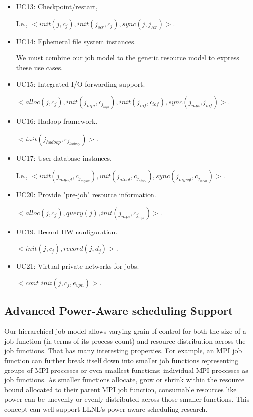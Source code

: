 \documentclass[10pt]{article}
\begin{document}
\begin{itemize}
\item{UC13: Checkpoint/restart, 

I.e., $<init(j, c_j), init(j_{scr}, c_j), sync(j, j_{scr})>$.} 

\item{UC14: Ephemeral file system instances. 

We must combine our job model to the generic resource model to express these use cases.}

\item{UC15: Integrated I/O forwarding support. 

$<alloc(j, c_j), init(j_{mpi}, c_{j_{mpi}}), init(j_{iof}, c_{iof}), sync(j_{mpi}, j_{iof})>$.}

\item{UC16: Hadoop framework. 

$<init(j_{hadoop}, c_{j_{hadoop}})>$.} 

\item{UC17: User database instances. 

I.e., $<init(j_{mysql}, c_{j_{mysql}}), init(j_{atool}, c_{j_{atool}}), sync(j_{mysql}, c_{j_{atool}})>$.}

\item{UC20: Provide "pre-job" resource information. 

$<alloc(j, c_j), query(j), init(j_{mpi}, c_{j_{mpi}})>$.}

\item{UC19: Record HW configuration. 

$<init(j, c_j), record(j, d_j)>$.}

\item{UC21: Virtual private networks for jobs. 

$<cont\_init(j, c_j, e_{vpn})>$.}

\end{itemize}


\subsection{Advanced Power-Aware scheduling Support}
Our hierarchical job model allows varying grain of control for both the size of
a job function (in terms of its process count) and resource distribution
across the job functions. 
That has many interesting properties. For example, an MPI 
job function can further break itself down into smaller job functions
representing groups of MPI processes or even smallest functions:
individual MPI processes as job functions.
As smaller functions allocate, grow or shrink within the resource
bound allocated to their parent MPI job function, consumable resources
like power can be unevenly or evenly distributed across 
those smaller functions. 
This concept can well support LLNL's power-aware scheduling research.
\end{document}

